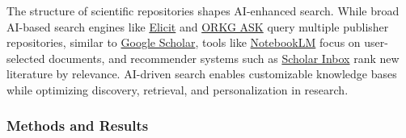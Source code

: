 The structure of scientific repositories shapes AI-enhanced search. While broad AI-based search engines like \href{https://elicit.com}{Elicit} and \href{https://ask.orkg.org}{ORKG ASK} query multiple publisher repositories, similar to \href{https://scholar.google.com}{Google Scholar}, tools like \href{https://notebooklm.google}{NotebookLM} focus on user-selected documents, and recommender systems such as \href{https://www.scholar-inbox.com/}{Scholar Inbox} rank new literature by relevance. AI-driven search enables customizable knowledge bases while optimizing discovery, retrieval, and personalization in research.


\subsubsection{Methods and Results}

